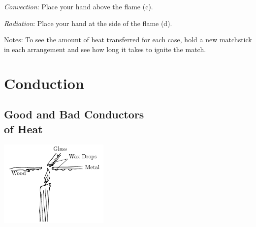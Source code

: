 \begin{multicols}{2}
\begin{description*}
{\emph{Convection}: Place your hand above the flame (c). 

\emph{Radiation}: Place your hand at the side of the flame (d).}
\item[Notes:]{To see the amount of heat transferred for each case, hold a new matchstick in each arrangement and see how long it takes to ignite the match.}
\end{description*}

\vfill
\columnbreak


\section*{Conduction} 


\subsection[Good and Bad Conductors of Heat]{Good and Bad Conductors \hfill \\ of Heat}

\begin{center}
\includegraphics[width=0.4\textwidth]{./img/heat-conduction.png}
\end{center}


\end{multicols}
